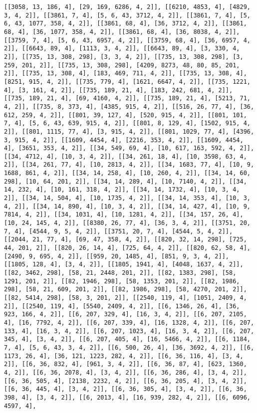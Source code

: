 \documentclass[12pt,fleqn]{article}\usepackage{../../common}
\begin{document}
\begin{verbatim}
[[3058, 13, 186, 4], [29, 169, 6286, 4, 2]], [[6210, 4853, 4], [4829, 3, 4, 2]], [[3861, 7, 4], [5, 6, 43, 3712, 4, 2]], [[3861, 7, 4], [5, 6, 43, 1077, 358, 4, 2]], [[3861, 68, 4], [36, 3712, 4, 2]], [[3861, 68, 4], [36, 1077, 358, 4, 2]], [[3861, 68, 4], [36, 8038, 4, 2]], [[3759, 7, 4], [5, 6, 43, 6957, 4, 2]], [[3759, 68, 4], [36, 6957, 4, 2]], [[6643, 89, 4], [1113, 3, 4, 2]], [[6643, 89, 4], [3, 330, 4, 2]], [[735, 13, 308, 298], [3, 3, 4, 2]], [[735, 13, 308, 298], [3, 259, 201, 2]], [[735, 13, 308, 298], [4209, 8273, 48, 80, 85, 201, 2]], [[735, 13, 308, 4], [183, 469, 711, 4, 2]], [[735, 13, 308, 4], [8251, 915, 4, 2]], [[735, 779, 4], [1621, 6647, 4, 2]], [[735, 1221, 4], [3, 161, 4, 2]], [[735, 189, 21, 4], [183, 242, 681, 4, 2]], [[735, 189, 21, 4], [69, 4160, 4, 2]], [[735, 189, 21, 4], [5213, 71, 4, 2]], [[735, 8, 373, 4], [4385, 915, 4, 2]], [[516, 26, 77, 4], [36, 612, 259, 4, 2]], [[801, 39, 127, 4], [520, 915, 4, 2]], [[801, 101, 7, 4], [5, 6, 43, 639, 915, 4, 2]], [[801, 8, 129, 4], [1502, 915, 4, 2]], [[801, 1115, 77, 4], [3, 915, 4, 2]], [[801, 1029, 77, 4], [4396, 3, 915, 4, 2]], [[1609, 4454, 4], [2216, 353, 4, 2]], [[1609, 4454, 4], [3651, 353, 4, 2]], [[34, 549, 69, 4], [10, 617, 163, 592, 4, 2]], [[34, 4712, 4], [10, 3, 4, 2]], [[34, 261, 18, 4], [10, 3598, 63, 4, 2]], [[34, 261, 77, 4], [10, 2813, 4, 2]], [[34, 1683, 77, 4], [10, 9, 1688, 861, 4, 2]], [[34, 14, 258, 4], [10, 260, 4, 2]], [[34, 14, 60, 298], [10, 64, 201, 2]], [[34, 14, 289, 4], [10, 7140, 4, 2]], [[34, 14, 232, 4], [10, 161, 318, 4, 2]], [[34, 14, 1732, 4], [10, 3, 4, 2]], [[34, 14, 504, 4], [10, 1735, 4, 2]], [[34, 14, 353, 4], [10, 3, 4, 2]], [[34, 14, 890, 4], [10, 3, 4, 2]], [[34, 14, 427, 4], [10, 9, 7814, 4, 2]], [[34, 1031, 4], [10, 1281, 4, 2]], [[34, 157, 26, 4], [10, 24, 145, 4, 2]], [[8380, 26, 77, 4], [36, 3, 4, 2]], [[3751, 20, 7, 4], [4544, 9, 5, 4, 2]], [[3751, 20, 7, 4], [4544, 5, 4, 2]], [[2044, 21, 77, 4], [69, 47, 358, 4, 2]], [[820, 32, 14, 298], [725, 44, 201, 2]], [[820, 26, 14, 4], [725, 64, 4, 2]], [[820, 62, 58, 4], [2490, 9, 695, 4, 2]], [[959, 20, 1485, 4], [851, 9, 3, 4, 2]], [[1805, 128, 4], [3, 4, 2]], [[1805, 1941, 4], [4048, 1637, 4, 2]], [[82, 3462, 298], [58, 21, 2448, 201, 2]], [[82, 1383, 298], [58, 1291, 201, 2]], [[82, 1946, 298], [58, 1353, 201, 2]], [[82, 1986, 298], [58, 21, 609, 201, 2]], [[82, 1986, 298], [58, 4270, 201, 2]], [[82, 5414, 298], [58, 3, 201, 2]], [[2540, 119, 4], [1051, 2409, 4, 2]], [[2540, 119, 4], [5540, 2409, 4, 2]], [[6, 1346, 26, 4], [36, 923, 166, 4, 2]], [[6, 207, 329, 4], [16, 3, 4, 2]], [[6, 207, 2105, 4], [16, 7792, 4, 2]], [[6, 207, 339, 4], [16, 1328, 4, 2]], [[6, 207, 133, 4], [16, 3, 4, 2]], [[6, 207, 1023, 4], [16, 3, 4, 2]], [[6, 207, 345, 4], [3, 4, 2]], [[6, 207, 405, 4], [16, 5466, 4, 2]], [[6, 1184, 7, 4], [5, 6, 43, 3, 4, 2]], [[6, 500, 26, 4], [36, 3692, 4, 2]], [[6, 1173, 26, 4], [36, 121, 1223, 282, 4, 2]], [[6, 36, 116, 4], [3, 4, 2]], [[6, 36, 832, 4], [961, 3, 4, 2]], [[6, 36, 87, 4], [623, 1360, 4, 2]], [[6, 36, 2078, 4], [3, 4, 2]], [[6, 36, 286, 4], [3, 4, 2]], [[6, 36, 505, 4], [2138, 2232, 4, 2]], [[6, 36, 205, 4], [3, 4, 2]], [[6, 36, 445, 4], [3, 4, 2]], [[6, 36, 305, 4], [3, 4, 2]], [[6, 36, 398, 4], [3, 4, 2]], [[6, 2013, 4], [16, 939, 282, 4, 2]], [[6, 6096, 4597, 4], 
\end{verbatim}
\end{document}
